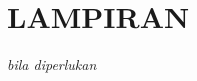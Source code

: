 \appendix
\chapter*{LAMPIRAN}
\setcounter{section}{0} %
\setcounter{page}{1}

\renewcommand{\thesection}{\Alph{section}}
\renewcommand{\thesubsection}{\Alph{section}.\arabic{subsection}\hspace{-0.25cm}}
\renewcommand{\thepage}{L - \arabic{page}}

\begin{center}
    \textit{bila diperlukan}
\end{center}